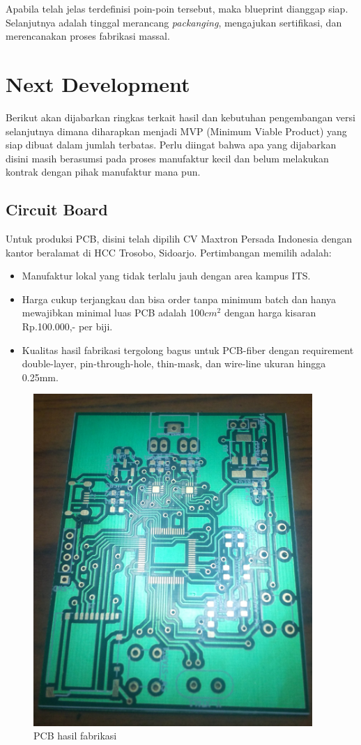 \documentclass[12pt,]{article}
\begin{document}
	Apabila telah jelas terdefinisi poin-poin tersebut, maka blueprint dianggap siap.
	Selanjutnya adalah tinggal merancang \textit{packanging}, mengajukan sertifikasi, dan merencanakan proses fabrikasi massal.
	
	\newpage
	\section{Next Development}
	
	Berikut akan dijabarkan ringkas terkait hasil dan kebutuhan pengembangan versi selanjutnya dimana
	diharapkan menjadi MVP (Minimum Viable Product) yang siap dibuat dalam jumlah terbatas.
	Perlu diingat bahwa apa yang dijabarkan disini masih berasumsi pada proses manufaktur kecil
	dan belum melakukan kontrak dengan pihak manufaktur mana pun.
	
	\subsection{Circuit Board}
	
	Untuk produksi PCB, disini telah dipilih CV Maxtron Persada Indonesia dengan kantor beralamat di HCC Trosobo, Sidoarjo.
	Pertimbangan memilih adalah:
	\begin{itemize}
		\item Manufaktur lokal yang tidak terlalu jauh dengan area kampus ITS.
		\item Harga cukup terjangkau dan bisa order tanpa minimum batch dan
		hanya mewajibkan minimal luas PCB adalah 100$cm^2$ dengan harga kisaran Rp.100.000,- per biji.
		\item Kualitas hasil fabrikasi tergolong bagus untuk PCB-fiber dengan requirement 
		double-layer, pin-through-hole, thin-mask, dan wire-line ukuran hingga 0.25mm. 
	\end{itemize}

	\begin{figure}[!ht]
		\centering
		\includegraphics[width=300pt]{images/pcb}
		\caption{PCB hasil fabrikasi}
	\end{figure}
\end{document}
